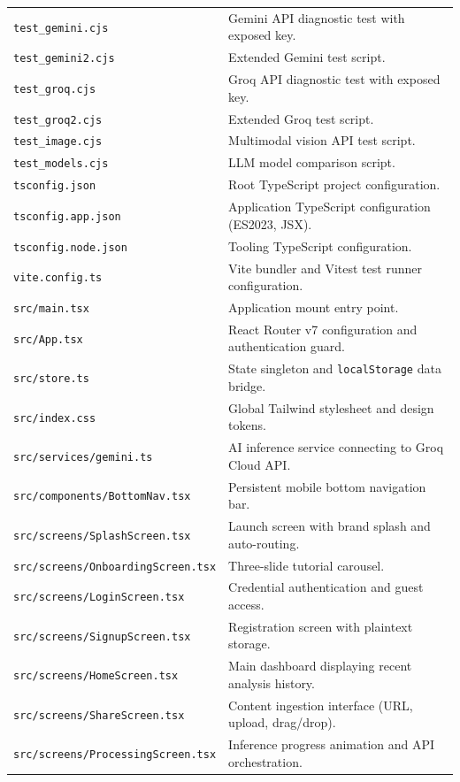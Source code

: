 \documentclass[10pt,a4paper]{report}
\begin{document}
\begin{longtable}{p{5.5cm} p{10.5cm}}
\texttt{test\_gemini.cjs} & Gemini API diagnostic test with exposed key. \\
\texttt{test\_gemini2.cjs} & Extended Gemini test script. \\
\texttt{test\_groq.cjs} & Groq API diagnostic test with exposed key. \\
\texttt{test\_groq2.cjs} & Extended Groq test script. \\
\texttt{test\_image.cjs} & Multimodal vision API test script. \\
\texttt{test\_models.cjs} & LLM model comparison script. \\
\texttt{tsconfig.json} & Root TypeScript project configuration. \\
\texttt{tsconfig.app.json} & Application TypeScript configuration (ES2023, JSX). \\
\texttt{tsconfig.node.json} & Tooling TypeScript configuration. \\
\texttt{vite.config.ts} & Vite bundler and Vitest test runner configuration. \\
\texttt{src/main.tsx} & Application mount entry point. \\
\texttt{src/App.tsx} & React Router v7 configuration and authentication guard. \\
\texttt{src/store.ts} & State singleton and \texttt{localStorage} data bridge. \\
\texttt{src/index.css} & Global Tailwind stylesheet and design tokens. \\
\texttt{src/services/gemini.ts} & AI inference service connecting to Groq Cloud API. \\
\texttt{src/components/BottomNav.tsx} & Persistent mobile bottom navigation bar. \\
\texttt{src/screens/SplashScreen.tsx} & Launch screen with brand splash and auto-routing. \\
\texttt{src/screens/OnboardingScreen.tsx} & Three-slide tutorial carousel. \\
\texttt{src/screens/LoginScreen.tsx} & Credential authentication and guest access. \\
\texttt{src/screens/SignupScreen.tsx} & Registration screen with plaintext storage. \\
\texttt{src/screens/HomeScreen.tsx} & Main dashboard displaying recent analysis history. \\
\texttt{src/screens/ShareScreen.tsx} & Content ingestion interface (URL, upload, drag/drop). \\
\texttt{src/screens/ProcessingScreen.tsx} & Inference progress animation and API orchestration. \\

\end{longtable}
\end{document}
